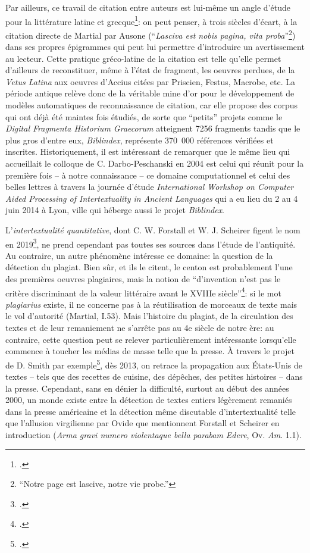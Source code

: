Par ailleurs, ce travail de citation entre auteurs est lui-même un angle d'étude pour la littérature latine et grecque\footcite{darbo-peschanski_citation_2004}: on peut penser, à trois siècles d'écart, à la citation directe de Martial par Ausone (\enquote{\textit{Lasciva est nobis pagina, vita proba}}\footnote{\enquote{Notre page est lascive, notre vie probe.}}) dans ses propres épigrammes qui peut lui permettre d'introduire un avertissement au lecteur. Cette pratique gréco-latine de la citation est telle qu'elle permet d'ailleurs de reconstituer, même à l'état de fragment, les oeuvres perdues, de la \textit{Vetus Latina} aux oeuvres d'Accius citées par Priscien, Festus, Macrobe, etc. La période antique relève donc de la véritable mine d'or pour le développement de modèles automatiques de reconnaissance de citation, car elle propose des corpus qui ont déjà été maintes fois étudiés, de sorte que \enquote{petits} projets comme le \textit{Digital Fragmenta Historium Graecorum} atteignent 7256 fragments tandis que le plus gros d'entre eux, \textit{Biblindex}, représente 370~000 références vérifiées et inscrites. Historiquement, il est intéressant de remarquer que le même lieu qui accueillait le colloque de C.  Darbo-Peschanski en 2004 est celui qui réunit pour la première fois -- à notre connaissance -- ce domaine computationnel et celui des belles lettres à travers la journée d'étude \textit{International Workshop on Computer Aided Processing of Intertextuality in Ancient Languages} qui a eu lieu du 2 au 4 juin 2014 à Lyon, ville qui héberge aussi le projet \textit{Biblindex}.

L'\textit{intertextualité quantitative}, dont C. W. Forstall et W. J. Scheirer figent le nom en 2019\footcite{forstall_quantitative_2019}, ne prend cependant pas toutes ses sources dans l'étude de l'antiquité. Au contraire, un autre phénomène intéresse ce domaine: la question de la détection du plagiat. Bien sûr, et ils le citent, le centon est probablement l'une des premières oeuvres plagiaires, mais la notion de \enquote{d'invention n'est pas le critère discriminant de la valeur littéraire avant le XVIIIe siècle}\footcite{aron_plagiat_2010}: si le mot \textit{plagiarius} existe, il ne concerne pas à la réutilisation de morceaux de texte mais le vol d'autorité (Martial, I.53). Mais l'histoire du plagiat, de la circulation des textes et de leur remaniement ne s'arrête pas au 4e siècle de notre ère: au contraire, cette question peut se relever particulièrement intéressante lorsqu'elle commence à toucher les médias de masse telle que la presse. À travers le projet de D. Smith par exemple\footcite{smith_computational_2015, smith_infectious_2013}, dès 2013, on retrace la propagation aux États-Unis de textes -- tels que des recettes de cuisine, des dépêches, des petites histoires -- dans la presse. Cependant, sans en dénier la difficulté, surtout au début des années 2000, un monde existe entre la détection de textes entiers légèrement remaniés dans la presse américaine et la détection même discutable d'intertextualité telle que l'allusion virgilienne par Ovide que mentionnent Forstall et Scheirer en introduction (\textit{Arma gravi numero violentaque bella parabam Edere}, Ov. \textit{Am}. 1.1). 

